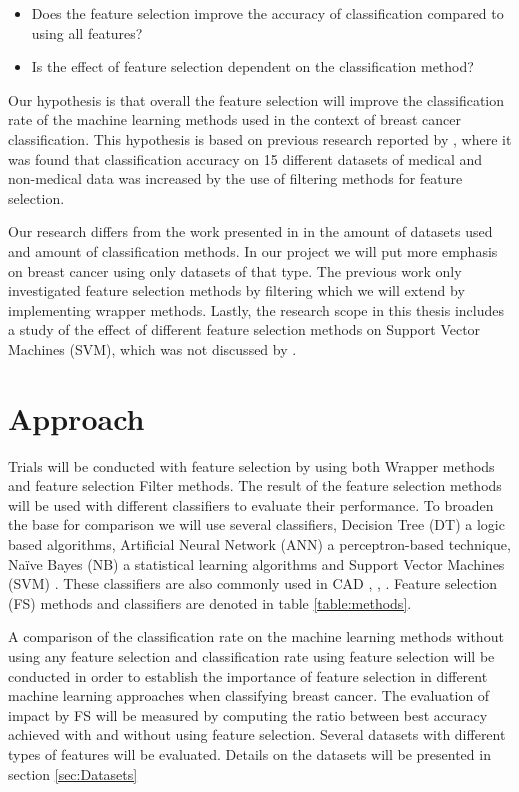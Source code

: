 \begin{itemize}
  \item Does the feature selection improve the accuracy of classification compared to using all features?
  \item Is the effect of feature selection dependent on the classification method?
\end{itemize}

Our hypothesis is that overall the feature selection will improve the classification rate of the machine learning methods used in the context of breast cancer classification. This hypothesis is based on previous research reported by \textcite{karabulut2012}, where it was found that classification accuracy on 15 different datasets of medical and non-medical data was increased by the use of filtering methods for feature selection.

Our research differs from the work presented in \parencite{karabulut2012} in the amount of datasets used and amount of classification methods. In our project we will put more emphasis on breast cancer using only datasets of that type. The previous work only investigated feature selection methods by filtering which we will extend by implementing wrapper methods. Lastly, the research scope in this thesis includes a study of the effect of different feature selection methods on Support Vector Machines (SVM), which was not discussed by \parencite{karabulut2012}.


\section{Approach}

Trials will be conducted with feature selection by using both Wrapper methods and feature selection Filter methods. The result of the feature selection methods will be used with different classifiers to evaluate their performance. To broaden the base for comparison we will use several classifiers, Decision Tree (DT) a logic based algorithms, Artificial Neural Network (ANN) a perceptron-based technique, Naïve Bayes (NB) a statistical learning algorithms and Support Vector Machines (SVM) \parencite{wallace2007}. These classifiers are also commonly used in CAD \parencite{ramos2012}, \parencite{akay2009}, \parencite{li2007}. Feature selection (FS) methods and classifiers are denoted in table \ref{table:methods}.



A comparison of the classification rate on the machine learning methods without using any feature selection and classification rate using feature selection will be conducted in order to establish the importance of feature selection in different machine learning approaches when classifying breast cancer. The evaluation of impact by FS will be measured by computing the ratio between best accuracy achieved with and without using feature selection. Several datasets with different types of features will be evaluated. Details on the datasets will be presented in section \ref{sec:Datasets}


